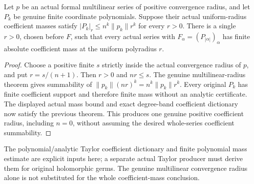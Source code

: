 \begin{theorem}
\label{hir:actual-multilinear-bands-positive-coefficient-radius}
Let $p$ be an actual formal multilinear series of positive convergence
radius, and let $P_k$ be genuine finite coordinate polynomials.
Suppose their actual uniform-radius coefficient masses satisfy
$|P_k|_r\leq n^k\|p_k\|r^k$ for every $r>0$.
There is a single $r>0$, chosen before $F$, such that every actual
series with $F_\alpha=(P_{|\alpha|})_\alpha$ has finite absolute
coefficient mass at the uniform polyradius $r$.
\leanok
\end{theorem}
\begin{proof}
Choose a positive finite $s$ strictly inside the actual convergence
radius of $p$, and put $r=s/(n+1)$. Then $r>0$ and $nr\leq s$.
The genuine multilinear-radius theorem gives summability of
$\|p_k\|(nr)^k=n^k\|p_k\|r^k$. Every original $P_k$ has finite
coefficient support and therefore finite mass without an analytic
certificate. The displayed actual mass bound and exact degree-band
coefficient dictionary now satisfy the previous theorem. This
produces one genuine positive coefficient radius, including $n=0$,
without assuming the desired whole-series coefficient summability.
\end{proof}

The polynomial/analytic Taylor coefficient dictionary and finite
polynomial mass estimate are explicit inputs here; a separate actual
Taylor producer must derive them for original holomorphic germs.
The genuine multilinear convergence radius alone is not substituted
for the whole coefficient-mass conclusion.
